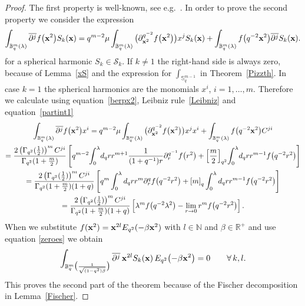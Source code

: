 \documentclass[11pt]{article}
\newcommand{\mR}{\mathbb{R}}
\newcommand{\mN}{\mathbb{N}}
\newcommand{\mS}{\mathbb{S}}
\newcommand{\mB}{\mathbb{B}}
\newcommand{\cS}{\mathcal{S}}
\numberwithin{equation}{section}
\begin{document}
\begin{proof}
The f\/irst property is well-known, see e.g.~\cite{MR1239953, MR1408120}. In order to prove the second property we consider the expression
\begin{gather*}
\int_{\mB^m_q(\lambda)}\overline{\partial^j}f\big(\bold{x}^2\big)S_k(\bold{x})
=q^{m-2}\mu\int_{\mB^m_q(\lambda)}\big(\partial_{\bold{x}^2}^{q^{-2}}f\big(\bold{x}^2\big)\big)x^j S_k(\bold{x})+\int_{\mB^m_q(\lambda)}f\big(q^{-2}\bold{x}^2\big)\overline{\partial^j}S_k(\bold{x}).
\end{gather*}
for a spherical harmonic $S_k\in\cS_k$. If $k\not=1$ the right-hand side is always zero, because of Lemma~\ref{xS} and the expression for $\int_{\mS^{m-1}_q}$ in Theorem~\ref{Pizzth}. In case $k=1$ the spherical harmonics are the monomials $x^i$, $i=1,\dots,m$. Therefore we calculate using equation~\eqref{berpx2}, Leibniz rule~\eqref{Leibniz} and equation~\eqref{partint1}
\begin{gather*}
\int_{\mB^m_q(\lambda)}\overline{\partial^j}f\big(\bold{x}^2\big)x^i
=q^{m-2}\mu\int_{\mB^m_q(\lambda)}\big(\partial_{\bold{x}^2}^{q^{-2}}f\big(\bold{x}^2\big)\big)x^j x^i+\int_{\mB^m_q(\lambda)}f\big(q^{-2}\bold{x}^2\big)C^{ji}\\
=\frac{2\left(\Gamma_{q^2}(\frac{1}{2})\right)^{m}C^{ji}}{\Gamma_{q^2}(1+\frac{m}{2})}\left[q^{m-2}\!\int_0^\lambda \!d_qr r^{m+1}\frac{1}{(1+q^{-1})r}\partial^{q^{-1}}_rf\big(r^2\big)+\left[\frac{m}{2}\right]_{q^2}\!\int_0^\lambda \! d_qr r^{m-1}f\big(q^{-2}r^2\big)\right]\\
=\frac{2\left(\Gamma_{q^2}(\frac{1}{2})\right)^{m}C^{ji}}{\Gamma_{q^2}(1+\frac{m}{2})(1+q)}\left[q^{m}\int_0^\lambda d_qr r^{m}\partial^q_rf\big(q^{-2}r^2\big)+\left[m\right]_q\int_0^\lambda d_qr r^{m-1}f\big(q^{-2}r^2\big)\right]\\
=\frac{2\left(\Gamma_{q^2}(\frac{1}{2})\right)^{m}C^{ji}}{\Gamma_{q^2}(1+\frac{m}{2})(1+q)}\left[\lambda^mf\big(q^{-2}\lambda^2\big)-\lim_{r\to0}r^m f\big(q^{-2}r^2\big)\right].
\end{gather*}
When we substitute $f(\bold{x}^2)=\bold{x}^{2l}E_{q^2}(-\beta \bold{x}^2)$ with $l\in\mN$ and $\beta\in\mR^+$ and use equation \eqref{zeroes} we obtain
\begin{gather*}
\int_{\mB^m_q\big(\frac{1}{\sqrt{(1-q^2)\beta}}\big)}\overline{\partial^j}\,\bold{x}^{2l}S_k(\bold{x})\,E_{q^2}\big({-}\beta \bold{x}^2\big) = 0\qquad \forall\, k,l.
\end{gather*}
This proves the second part of the theorem because of the Fischer decomposition in Lem\-ma~\ref{Fischer}.
\end{proof}
\end{document}
